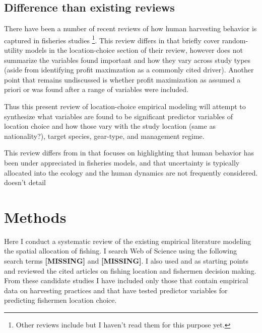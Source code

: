 \documentclass[12pt, a4paper]{article}
\begin{document}
\subsection{Difference than existing reviews}
There have been a number of recent reviews of how human harvesting behavior is captured in fisheries studies \citep{vanPuttenetal2011}\footnote{Other reviews include \cite{Fultonetal2011, HayniePfeiffer2012} but I haven't read them for this purpose yet.}. This review differs in that \cite{vanPuttenetal2011} briefly cover random-utility models in the location-choice section of their review, however does not summarize the variables found important and how they vary across study types (aside from identifying profit maximzation as a commonly cited driver). Another point that remains undiscussed is whether profit maximization as assumed a priori or was found after a range of variables were included. 

Thus this present review of location-choice empirical modeling will attempt to synthesize what variables are found to be significant predictor variables of location choice and how those vary with the study location (same as nationality?), target species, gear-type, and management regime. 

This review differs from \cite{Fultonetal2011} in that \cite{Fultonetal2011} focuses on highlighting that human behavior has been under appreciated in fisheries models, and that uncertainty is typically allocated into the ecology and the human dynamics are not frequently considered. \cite{Fultonetal2011} doesn't detail 

\section{Methods}
Here I conduct a systematic review of the existing empirical literature modeling the spatial allocation of fishing. I search Web of Science using the following search terms {\bf [MISSING]} and {\bf [MISSING]}. I also used \cite{Fultonetal2011} and \cite{vanPuttenetal2011} as starting points and reviewed the cited articles on fishing location and fishermen decision making. From these candidate studies I have included only those that contain empirical data on harvesting practices and that have tested predictor variables for predicting fishermen location choice. 



\end{document}
